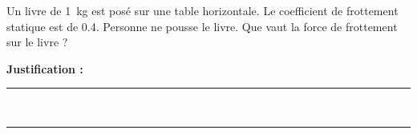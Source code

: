 Un livre de \qty{1}{kg} est posé sur une table horizontale. Le coefficient de frottement statique est de \num{0.4}. Personne ne pousse le livre. Que vaut la force de frottement sur le livre ?

\choices

\noindent\textbf{Justification :} \hrulefill \\[2.5ex]
\rule{\linewidth}{0.4pt} \\[2.5ex]
\rule{\linewidth}{0.4pt}
\vfill
